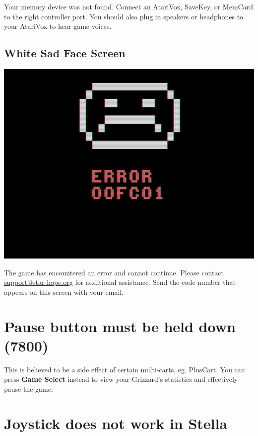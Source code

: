 \documentclass[10pt,twocolumn,openany,article]{memoir}
\begin{document}
Your  memory device  was not  found.  Connect an  AtariVox, SaveKey,  or
MemCard to the  right controller port. You should also  plug in speakers
or headphones to your AtariVox to hear game voices.

\fi\fi

\subsection{White Sad Face Screen}

\includegraphics[width=\columnwidth]{../Manual/WhiteSadFaceNTSC.png}

The game  has encountered an  error and cannot continue.  Please contact
\href{mailto:support@star-hope.org}{support@star-hope.org}           for
additional assistance. Send the code  number that appears on this screen
with your email.

\ifdefined\ATARIAGESAVE\else

\section*{Pause button must be held down (7800)}

This  is believed  to  be  a side  effect  of  certain multi-carts,  eg.
PlusCart.  You  can press  \textbf{Game  Select}  instead to  view  your
Grizzard's statistics and effectively pause the game.

\section*{Joystick does not work in Stella}
\end{document}
